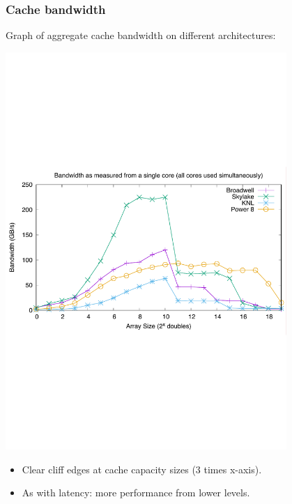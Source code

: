 \documentclass{beamer}
\begin{document}
\begin{frame}
\frametitle{Cache bandwidth}

Graph of aggregate cache bandwidth on different architectures:
\begin{center}
\includegraphics[width=0.8\textwidth]{cache_bandwidth}
\end{center}

\begin{itemize}
  \item Clear cliff edges at cache capacity sizes (3 times x-axis).
  \item As with latency: more performance from lower levels.
\end{itemize}



\end{frame}
\end{document}
